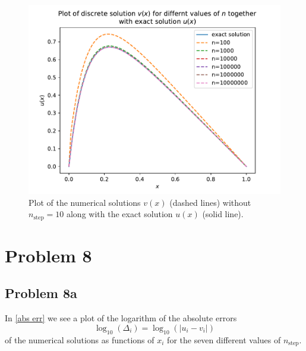 \documentclass[english,notitlepage]{revtex4-1}  %
\begin{document}
\begin{figure}[h!]
    \centering 
    \includegraphics[scale=0.80]{../data/exactVSdiscrete_wo10.pdf} %
    \caption{Plot of the numerical solutions $v(x)$ (dashed lines) without $n_\text{step} = 10$ along with the exact solution $u(x)$ (solid line).}
    \label{plot7b w/o 10}
\end{figure}

\section*{Problem 8}
\subsection*{Problem 8a}
In \cref*{abs err} we see a plot of the logarithm of the absolute errors 
\begin{equation}
    \log_{10}(\Delta_i) = \log_{10}(|u_i - v_i|)
\end{equation}
of the numerical solutions as functions of $x_i$ for the seven different values of $n_\text{step}$.
\end{document}

